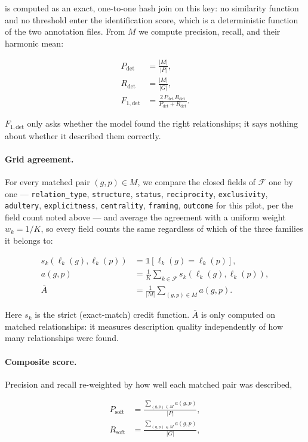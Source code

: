 is computed as an exact, one-to-one hash join on this key: no similarity function and no
threshold enter the identification score, which is a deterministic function of the two
annotation files. From $M$ we compute precision, recall, and their harmonic mean:

\begin{align}
P_{\mathrm{det}} &= \frac{|M|}{|P|} , \\
R_{\mathrm{det}} &= \frac{|M|}{|G|} , \\
F_{1,\mathrm{det}} &= \frac{2\,P_{\mathrm{det}}\,R_{\mathrm{det}}}{P_{\mathrm{det}} + R_{\mathrm{det}}} .
\end{align}

$F_{1,\mathrm{det}}$ only asks whether the model found the right relationships; it says
nothing about whether it described them correctly.

\paragraph{Grid agreement.} For every matched pair $(g,p) \in M$, we compare the closed
fields of $\mathcal{F}$ one by one — \texttt{relation\_type}, \texttt{structure},
\texttt{status}, \texttt{reciprocity}, \texttt{exclusivity}, \texttt{adultery},
\texttt{explicitness}, \texttt{centrality}, \texttt{framing}, \texttt{outcome} for this pilot,
per the field count noted above — and average the agreement with a uniform weight $w_k = 1/K$,
so every field counts the same regardless of which of the three families it belongs to:

\begin{align}
s_k(\ell_k(g), \ell_k(p)) &= \mathbb{1}[\ell_k(g) = \ell_k(p)] , \\
a(g,p) &= \frac{1}{K}\sum_{k \in \mathcal{F}} s_k(\ell_k(g), \ell_k(p)) , \\
\bar{A} &= \frac{1}{|M|}\sum_{(g,p)\in M} a(g,p) .
\end{align}

Here $s_k$ is the strict (exact-match) credit function. $\bar A$ is only computed on matched
relationships: it measures description quality independently of how many relationships were
found.

\paragraph{Composite score.} Precision and recall re-weighted by how well each matched
pair was described,

\begin{align}
P_{\mathrm{soft}} &= \frac{\sum_{(g,p) \in M} a(g,p)}{|P|} , \\
R_{\mathrm{soft}} &= \frac{\sum_{(g,p) \in M} a(g,p)}{|G|} ,
\end{align}

